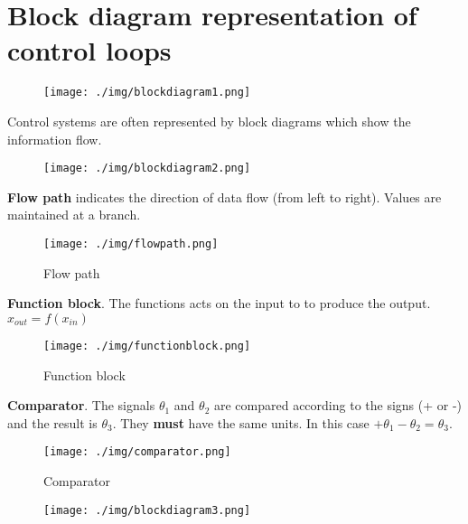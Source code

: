 \section{Block diagram representation of control loops}
\begin{figure}[H]
  \centering
  \texttt{[image: ./img/blockdiagram1.png]}
\end{figure}
Control systems are often represented by block diagrams which show the information flow.
\begin{figure}[H]
  \centering
  \texttt{[image: ./img/blockdiagram2.png]}
\end{figure}
\textbf{Flow path} indicates the direction of data flow (from left to right). Values are maintained at a branch.
\begin{figure}[H]
  \centering
  \texttt{[image: ./img/flowpath.png]}
  \caption{Flow path}
\end{figure}
\textbf{Function block}. The functions acts on the input to to produce the output. $x_{out} = f(x_{in})$
\begin{figure}[H]
  \centering
  \texttt{[image: ./img/functionblock.png]}
  \caption{Function block}
\end{figure}
\textbf{Comparator}. The signals $\theta_1$ and $\theta_2$ are compared according to the signs (+ or -) and the result is $\theta_3$. They \textbf{must} have the same units. In this case $+\theta_1 - \theta_2 = \theta_3$.
\begin{figure}[H]
  \centering
  \texttt{[image: ./img/comparator.png]}
  \caption{Comparator}
\end{figure}
\begin{figure}[H]
  \centering
  \texttt{[image: ./img/blockdiagram3.png]}
\end{figure}
